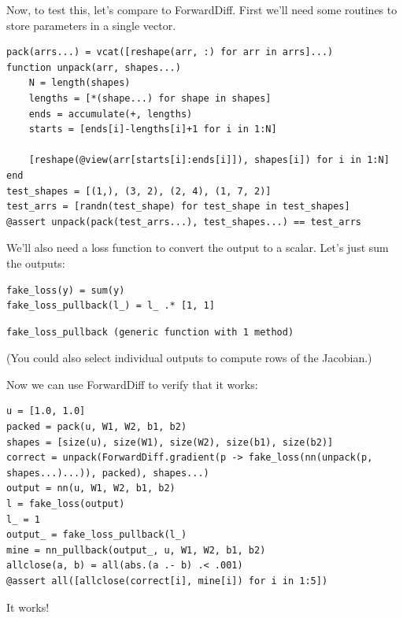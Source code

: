 \documentclass[11pt]{article}
\begin{document}
Now, to test this, let's compare to ForwardDiff. First we'll need some routines to store parameters in a single vector.
\begin{verbatim}
pack(arrs...) = vcat([reshape(arr, :) for arr in arrs]...)
function unpack(arr, shapes...)
    N = length(shapes)
    lengths = [*(shape...) for shape in shapes]
    ends = accumulate(+, lengths)
    starts = [ends[i]-lengths[i]+1 for i in 1:N]

    [reshape(@view(arr[starts[i]:ends[i]]), shapes[i]) for i in 1:N]
end
test_shapes = [(1,), (3, 2), (2, 4), (1, 7, 2)]
test_arrs = [randn(test_shape) for test_shape in test_shapes]
@assert unpack(pack(test_arrs...), test_shapes...) == test_arrs
\end{verbatim}
We'll also need a loss function to convert the output to a scalar. Let's just sum the outputs:
\begin{verbatim}
fake_loss(y) = sum(y)
fake_loss_pullback(l_) = l_ .* [1, 1]
\end{verbatim}
\begin{verbatim}
fake_loss_pullback (generic function with 1 method)
\end{verbatim}

(You could also select individual outputs to compute rows of the Jacobian.)

Now we can use ForwardDiff to verify that it works:
\begin{verbatim}
u = [1.0, 1.0]
packed = pack(u, W1, W2, b1, b2)
shapes = [size(u), size(W1), size(W2), size(b1), size(b2)]
correct = unpack(ForwardDiff.gradient(p -> fake_loss(nn(unpack(p, shapes...)...)), packed), shapes...)
output = nn(u, W1, W2, b1, b2)
l = fake_loss(output)
l_ = 1
output_ = fake_loss_pullback(l_)
mine = nn_pullback(output_, u, W1, W2, b1, b2)
allclose(a, b) = all(abs.(a .- b) .< .001)
@assert all([allclose(correct[i], mine[i]) for i in 1:5])
\end{verbatim}
It works!
\end{document}
